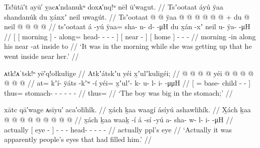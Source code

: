 
\ex\label{ex:94-12-while-waking-went-inside-near}%
%
\begingl
	\glpreamble	Ts!ūtā′t ayū′ ỵacᴀ′ndanukᵘ doxᴀ′nq!ᵘ nēł ū′wagut. //
	\glpreamble	Tsʼootaat áyú ÿaa shandanúk du x̱ánxʼ neil uwagút. //
	\gla	{} {} Tsʼootaat @ {} {}  @ {} 
			ÿaa @  @ {} @ {} @ {} @ {} @ {} {} +
		{} du  @ {} {}
		{} neil @ {} {}
		 @ {} @ {} @ {} //
	\glb	{} {} tsʼootaat {} {} á -yú
		ÿaa= sha- n- d-  -μH {} {}
		{} du x̱án -xʼ {}
		{} neil {} {}
		u- ÿa-  -μH //
	\glc	{}[ {}[ morning \· {}]  -
			along= head- - -  - \· {}]
		{}[  near - {}]
		{}[ home \· {}]
		- -  - //
	\gld	{} {} morning -in {} 
			along  {} {} {} {} {} {} {}
		{} his near -at {}
		{} inside \·to {}
		 {} {} {} //
	\glft	‘It was in the morning while she was getting up that he went inside near her.’
		//
\endgl
\xe

\ex\label{ex:94-13-boy-big-stomach}%
%
\begingl
	\glpreamble	ᴀtk!ᴀˈtsk!ᵒ yē′q!ołkułige //
	\glpreamble	Atkʼátskʼu yéi x̱ʼulʼkuligéi;  //
	\gla	{}  @ {} @ {} @ {} @ {} {}
		yéi @  @ {} @ {} @ {} @ {} @ {} @ {} //
	\glb	{} at= kʼí- ÿáts -kʼʷ -í {}
		yéi= x̱ʼulʼ- k- u- l- i-  -μμH //
	\glc	{}[ = base- child - - {}]
		thus= stomach- - - - -  - //
	\gld	{}  {} {} {} {} {}
		thus=  {} {} {} {} {} //
	\glft	‘The boy was big in the stomach;’
		//
\endgl
\xe



\ex\label{ex:94-14-filled-with-eyes}%
%
\begingl
	\glpreamble	xātc qā′wag̣e ᴀsīyu′ aca′ołīhîk. //
	\glpreamble	x̱ách ḵaa waag̱í ásíyú ashawlihík. //
	\gla	X̱ách {} ḵaa  @ {} {}  @ {} @ {}
		 @ {} @ {} @ {} @ {} @ {} @ {} //
	\glb	x̱ách {} ḵaa waaḵ -í {} á -sí -yú
		a- sha- w- l- i-  -μH //
	\glc	actually {}[  eye - {}]  - -
		- head- - - -  - //
	\gld	actually {} ppl’s eye {} {}  {} {}
		 //
	\glft	‘Actually it was apparently people’s eyes that had filled him.’
		//
\endgl
\xe

